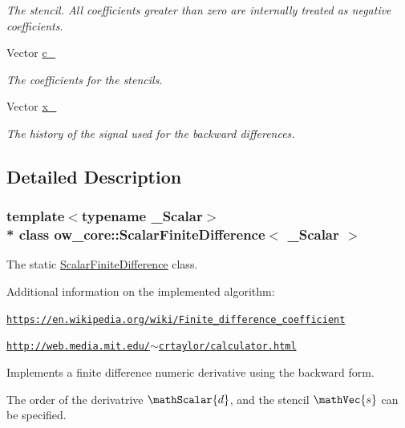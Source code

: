 \begin{DoxyCompactItemize}
\begin{DoxyCompactList}\small\item\em The stencil. All coefficients greater than zero are internally treated as negative coefficients. \end{DoxyCompactList}\item 
Vector \hyperlink{classow__core_1_1ScalarFiniteDifference_a0e523114ef5cf9a0c1c03b8ef02e85f6}{c\+\_\+}
\begin{DoxyCompactList}\small\item\em The coefficients for the stencils. \end{DoxyCompactList}\item 
Vector \hyperlink{classow__core_1_1ScalarFiniteDifference_a3f7d418f64d44b55cf1f5c2de4830710}{x\+\_\+}
\begin{DoxyCompactList}\small\item\em The history of the signal used for the backward differences. \end{DoxyCompactList}\end{DoxyCompactItemize}


\subsection{Detailed Description}
\subsubsection*{template$<$typename \+\_\+\+Scalar$>$\\*
class ow\+\_\+core\+::\+Scalar\+Finite\+Difference$<$ \+\_\+\+Scalar $>$}

The static \hyperlink{classow__core_1_1ScalarFiniteDifference}{Scalar\+Finite\+Difference} class. 

Additional information on the implemented algorithm\+:
\begin{DoxyItemize}
\item \href{https://en.wikipedia.org/wiki/Finite_difference_coefficient}{\tt https\+://en.\+wikipedia.\+org/wiki/\+Finite\+\_\+difference\+\_\+coefficient}
\item \href{http://web.media.mit.edu/~crtaylor/calculator.html}{\tt http\+://web.\+media.\+mit.\+edu/$\sim$crtaylor/calculator.\+html}
\end{DoxyItemize}

Implements a finite difference numeric derivative using the backward form.

The order of the derivatrive $\mathScalar{d}$, and the stencil $\mathVec{s}$ can be specified.


